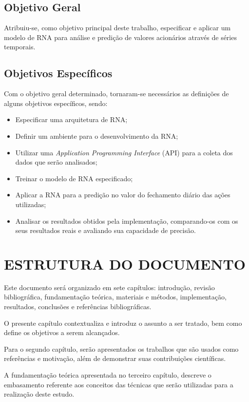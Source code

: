 \subsection{Objetivo Geral} 
Atribuiu-se, como objetivo principal deste trabalho, especificar e aplicar um modelo de RNA para análise e predição de valores acionários através de séries temporais.

\subsection{Objetivos Específicos}\label{subsec:objetivos_especificos}
Com o objetivo geral determinado, tornaram-se necessários as definições de alguns objetivos específicos, sendo:
\begin{itemize}
	\item Especificar uma arquitetura de RNA;
	\item Definir um ambiente para o desenvolvimento da RNA;
	\item Utilizar uma \textit{Application Programming Interface} (API) para a coleta dos dados que serão analisados;
	\item Treinar o modelo de RNA especificado;
	\item Aplicar a RNA para a predição no valor do fechamento diário das ações utilizadas;
	\item Analisar os resultados obtidos pela implementação, comparando-os com os seus resultados reais e avaliando sua capacidade de precisão.
\end{itemize}

\section{ESTRUTURA DO DOCUMENTO}\label{sec:organizacao-trabalho}
Este documento será organizado em sete capítulos: introdução, revisão bibliográfica, fundamentação teórica, materiais e métodos, implementação, resultados, conclusões e referências bibliográficas.

O presente capítulo contextualiza e introduz o assunto a ser tratado, bem como define os objetivos a serem alcançados.

Para o segundo capítulo, serão apresentados os trabalhos que são usados como referências e motivação, além de demonstrar suas contribuições científicas.

A fundamentação teórica apresentada no terceiro capítulo, descreve o embasamento referente aos conceitos das técnicas que serão utilizadas para a realização deste estudo.

